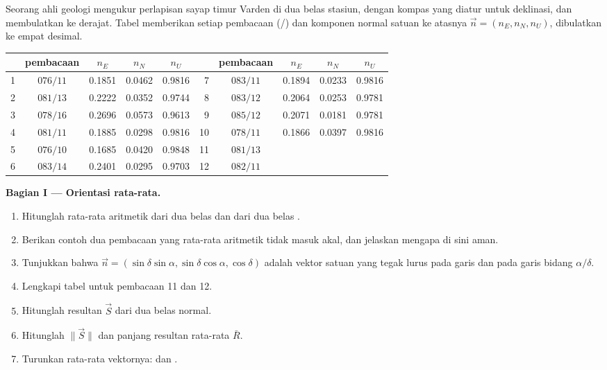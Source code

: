 \begin{problem}
\label{pb:b1:field-lab-methods-1:1}
Seorang ahli geologi mengukur perlapisan sayap timur  Varden di dua belas stasiun, dengan kompas yang diatur untuk deklinasi, dan membulatkan ke derajat. Tabel memberikan setiap pembacaan (/) dan komponen normal satuan ke atasnya $\vec n = (n_E, n_N, n_U)$, dibulatkan ke empat desimal.
\begin{center}
\small
\begin{tabular}{rcccc@{\qquad}rcccc}
\hline
 & pembacaan & $n_E$ & $n_N$ & $n_U$ & & pembacaan & $n_E$ & $n_N$ & $n_U$ \\
\hline
1 & $076/11$ & 0.1851 & 0.0462 & 0.9816 & 7 & $083/11$ & 0.1894 & 0.0233 & 0.9816 \\
2 & $081/13$ & 0.2222 & 0.0352 & 0.9744 & 8 & $083/12$ & 0.2064 & 0.0253 & 0.9781 \\
3 & $078/16$ & 0.2696 & 0.0573 & 0.9613 & 9 & $085/12$ & 0.2071 & 0.0181 & 0.9781 \\
4 & $081/11$ & 0.1885 & 0.0298 & 0.9816 & 10 & $078/11$ & 0.1866 & 0.0397 & 0.9816 \\
5 & $076/10$ & 0.1685 & 0.0420 & 0.9848 & 11 & $081/13$ & & & \\
6 & $083/14$ & 0.2401 & 0.0295 & 0.9703 & 12 & $082/11$ & & & \\
\hline
\end{tabular}
\end{center}

\medskip
\noindent\textbf{Bagian I --- Orientasi rata-rata.}
\begin{enumerate}
  \item Hitunglah rata-rata aritmetik dari dua belas  dan dari dua belas .
  \item Berikan contoh dua pembacaan yang rata-rata aritmetik  tidak masuk akal, dan jelaskan mengapa di sini aman.
  \item Tunjukkan bahwa $\vec n = (\sin\delta\sin\alpha, \sin\delta\cos\alpha,
        \cos\delta)$ adalah vektor satuan yang tegak lurus pada garis  dan pada garis  bidang $\alpha/\delta$.
  \item Lengkapi tabel untuk pembacaan 11 dan 12.
  \item Hitunglah resultan $\vec S$ dari dua belas normal.
  \item Hitunglah $\|\vec S\|$ dan panjang resultan rata-rata $\bar R$.
  \item Turunkan rata-rata vektornya:  dan .
\end{enumerate}


\end{problem}
